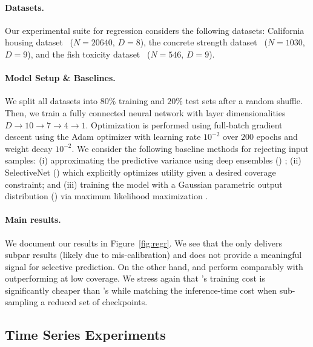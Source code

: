 \paragraph{Datasets.} Our experimental suite for regression considers the following datasets: %
California housing dataset~\citep{pace1997sparse} ($N=20640$, $D=8$), the concrete strength dataset~\citep{misc_concrete_compressive_strength_165} ($N=1030$, $D=9$), and the fish toxicity dataset~\citep{misc_qsar_fish_toxicity_504} ($N=546$, $D=9$). 

\paragraph{Model Setup \& Baselines.} We split all datasets into $80\%$ training and $20\%$ test sets after a random shuffle. Then, we train a fully connected neural network with layer dimensionalities $D \rightarrow 10 \rightarrow 7 \rightarrow 4 \rightarrow 1$. Optimization is performed using full-batch gradient descent using the Adam optimizer with learning rate $10^{-2}$ over $200$ epochs and weight decay $10^{-2}$. We consider the following baseline methods for rejecting input samples: (i) approximating the predictive variance using deep ensembles (\de) \citep{balaji2017uncertainty, zaoui2020regression}; (ii) SelectiveNet (\sn) which explicitly optimizes utility given a desired coverage constraint; and (iii) training the model with a Gaussian parametric output distribution (\odist) via maximum likelihood maximization \citep{alexandrov2019gluonts}.

\paragraph{Main results.} We document our results in Figure~\ref{fig:regr}. We see that the \odist only delivers subpar results (likely due to mis-calibration) and does not provide a meaningful signal for selective prediction. On the other hand, \de and \sptd perform comparably with \sptd outperforming \de at low coverage. We stress again that \sptd's training cost is significantly cheaper than \de's while matching the inference-time cost when sub-sampling a reduced set of checkpoints. 

\subsection{Time Series Experiments}
\label{sec:ts_exp}

